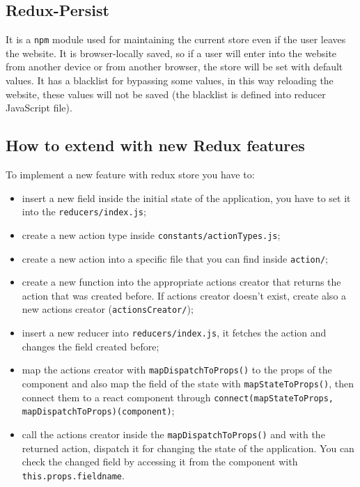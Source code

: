 \subsection{Redux-Persist}
It is a \texttt{npm} module used for maintaining the current store even if the user leaves the website. It is browser-locally saved, so if a user will enter into the website from another device or from another browser, the store will be set with default values. It has a blacklist for bypassing some values, in this way reloading the website, these values will not be saved (the blacklist is defined into reducer JavaScript file).

\subsection{How to extend with new Redux features}
To implement a new feature with redux store you have to:
\begin{itemize}
	\item insert a new field inside the initial state of the application, you have to set it into the \texttt{reducers/index.js};
	\item create a new action type inside \texttt{constants/actionTypes.js};
	\item create a new action into a specific file that you can find inside \texttt{action/};
	\item create a new function into the appropriate actions creator that returns the action that was created before. If actions creator doesn't exist, create also a new actions creator (\texttt{actionsCreator/});
	\item insert a new reducer into \texttt{reducers/index.js}, it fetches the action and changes the field created before;
	\item map the actions creator with \texttt{mapDispatchToProps()} to the props of the component and also map the field of the state with \texttt{mapStateToProps()}, then connect them to a react component through \texttt{connect(mapStateToProps, mapDispatchToProps)(component)};
	\item call the actions creator inside the \texttt{mapDispatchToProps()} and with the returned action, dispatch it for changing the state of the application. You can check the changed field by accessing it from the component with \texttt{this.props.fieldname}. 
\end{itemize}
